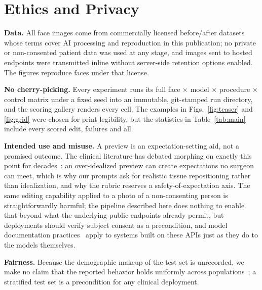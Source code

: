 \section{Ethics and Privacy}
\label{sec:ethics}

\textbf{Data.} All face images come from commercially licensed before/after
datasets whose terms cover AI processing and reproduction in this publication; no
private or non-consented patient data was used at any stage, and images sent to
hosted endpoints were transmitted inline without server-side retention options
enabled. The figures reproduce faces under that license.

\textbf{No cherry-picking.} Every experiment runs its full face $\times$ model
$\times$ procedure $\times$ control matrix under a fixed seed into an immutable,
git-stamped run directory,
and the scoring gallery renders every cell. The examples in
Figs.~\ref{fig:teaser} and \ref{fig:grid} were chosen for print legibility, but
the statistics in Table~\ref{tab:main} include every scored edit, failures and
all.

\textbf{Intended use and misuse.} A preview is an expectation-setting aid, not a
promised outcome. The clinical literature has debated morphing on exactly this
point for decades~\cite{agarwal2007morph}: an over-idealized preview can create
expectations no surgeon can meet, which is why our prompts ask for realistic
tissue repositioning rather than idealization, and why the rubric reserves a
safety-of-expectation axis. The same editing capability applied to a photo of a
non-consenting person is straightforwardly harmful; the pipeline described here
does nothing to enable that beyond what the underlying public endpoints already
permit, but deployments should verify subject consent as a precondition, and model
documentation practices~\cite{mitchell2019modelcards} apply to systems built on
these APIs just as they do to the models themselves.

\textbf{Fairness.} Because the demographic makeup of the test set is unrecorded,
we make no claim that the reported behavior holds uniformly across
populations~\cite{buolamwini2018gendershades}; a stratified test set is a
precondition for any clinical deployment.
